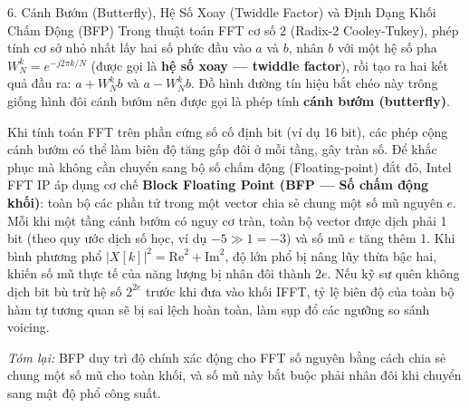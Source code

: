 \begin{feynmanbox}{6. Cánh Bướm (Butterfly), Hệ Số Xoay (Twiddle Factor) và Định Dạng Khối Chấm Động (BFP)}
Trong thuật toán FFT cơ số 2 (Radix-2 Cooley-Tukey), phép tính cơ sở nhỏ nhất lấy hai số phức đầu vào $a$ và $b$, nhân $b$ với một hệ số pha $W_N^k = e^{-j 2\pi k / N}$ (được gọi là \textbf{hệ số xoay --- twiddle factor}), rồi tạo ra hai kết quả đầu ra: $a + W_N^k b$ và $a - W_N^k b$. Đồ hình đường tín hiệu bắt chéo này trông giống hình đôi cánh bướm nên được gọi là phép tính \textbf{cánh bướm (butterfly)}.

Khi tính toán FFT trên phần cứng số cố định bit (ví dụ 16 bit), các phép cộng cánh bướm có thể làm biên độ tăng gấp đôi ở mỗi tầng, gây tràn số. Để khắc phục mà không cần chuyển sang bộ số chấm động (Floating-point) đắt đỏ, Intel FFT IP áp dụng cơ chế \textbf{Block Floating Point (BFP --- Số chấm động khối)}: toàn bộ các phần tử trong một vector chia sẻ chung một số mũ nguyên $e$. Mỗi khi một tầng cánh bướm có nguy cơ tràn, toàn bộ vector được dịch phải 1 bit (theo quy ước dịch số học, ví dụ $-5 \gg 1 = -3$) và số mũ $e$ tăng thêm 1. Khi bình phương phổ $|X[k]|^2 = \mathrm{Re}^2 + \mathrm{Im}^2$, độ lớn phổ bị nâng lũy thừa bậc hai, khiến số mũ thực tế của năng lượng bị nhân đôi thành $2e$. Nếu kỹ sư quên không dịch bit bù trừ hệ số $2^{2e}$ trước khi đưa vào khối IFFT, tỷ lệ biên độ của toàn bộ hàm tự tương quan sẽ bị sai lệch hoàn toàn, làm sụp đổ các ngưỡng so sánh voicing.

\emph{Tóm lại:} BFP duy trì độ chính xác động cho FFT số nguyên bằng cách chia sẻ chung một số mũ cho toàn khối, và số mũ này bắt buộc phải nhân đôi khi chuyển sang mật độ phổ công suất.
\end{feynmanbox}

